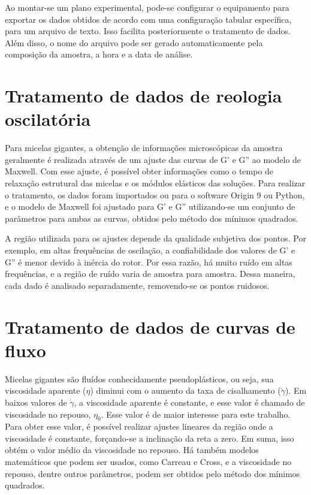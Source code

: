 		Ao montar-se um plano experimental, pode-se configurar o equipamento para exportar os dados obtidos de acordo com uma configuração tabular específica, para um arquivo de texto. Isso facilita posteriormente o tratamento de dados. Além disso, o nome do arquivo pode ser gerado automaticamente pela composição da amostra, a hora e a data de análise.
		
		\section{Tratamento de dados de reologia oscilatória}
		
		Para micelas gigantes, a obtenção de informações microscópicas da amostra geralmente é realizada através de um ajuste das curvas de G' e G'' ao modelo de Maxwell. Com esse ajuste, é possível obter informações como o tempo de relaxação estrutural das micelas e os módulos elásticos das soluções. Para realizar o tratamento, os dados foram importados ou para o software Origin\textcopyright{} 9 ou Python, e o modelo de Maxwell foi ajustado para G' e G'' utilizando-se um conjunto de parâmetros para ambas as curvas, obtidos pelo método dos mínimos quadrados.
		
		A região utilizada para os ajustes depende da qualidade subjetiva dos pontos. Por exemplo, em altas frequências de oscilação, a confiabilidade dos valores de G' e G'' é menor devido à inércia do rotor. Por essa razão, há muito ruído em altas frequências, e a região de ruído varia de amostra para amostra. Dessa maneira, cada dado é analisado separadamente, removendo-se os pontos ruidosos.
		
		\section{Tratamento de dados de curvas de fluxo}
		
		Micelas gigantes são fluídos conhecidamente pseudoplásticos, ou seja, sua viscosidade aparente (\(\eta\)) diminui com o aumento da taxa de cisalhamento (\(\dot{\gamma}\)). Em baixos valores de \(\dot{\gamma}\), a viscosidade aparente é constante, e esse valor é chamado de viscosidade no repouso, \(\eta_0\). Esse valor é de maior interesse para este trabalho. Para obter esse valor, é possível realizar ajustes lineares da região onde a viscosidade é constante, forçando-se a inclinação da reta a zero. Em suma, isso obtém o valor médio da viscosidade no repouso. Há também modelos matemáticos que podem ser usados, como Carreau e Cross, e a viscosidade no repouso, dentre outros parâmetros, podem ser obtidos pelo método dos mínimos quadrados.
		
